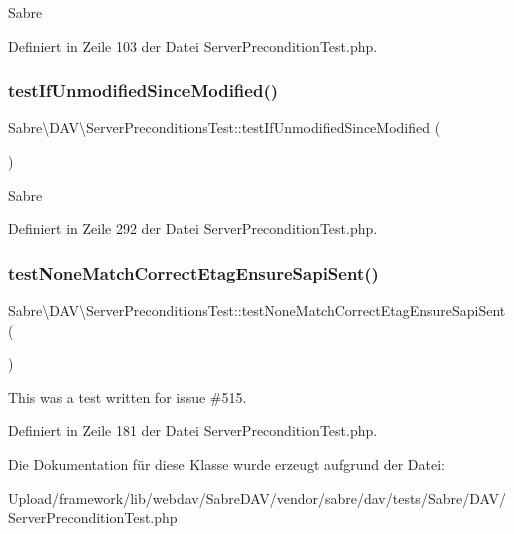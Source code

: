 Sabre 

Definiert in Zeile 103 der Datei Server\+Precondition\+Test.\+php.

\mbox{\label{class_sabre_1_1_d_a_v_1_1_server_preconditions_test_acf099f3a4f922119452b6012a642ec71}} 
\subsubsection{\texorpdfstring{test\+If\+Unmodified\+Since\+Modified()}{testIfUnmodifiedSinceModified()}}
{\footnotesize\ttfamily Sabre\textbackslash{}\+D\+A\+V\textbackslash{}\+Server\+Preconditions\+Test\+::test\+If\+Unmodified\+Since\+Modified (\begin{DoxyParamCaption}{ }\end{DoxyParamCaption})}

Sabre 

Definiert in Zeile 292 der Datei Server\+Precondition\+Test.\+php.

\mbox{\label{class_sabre_1_1_d_a_v_1_1_server_preconditions_test_a2e923dabb07a228337215eebd2a91e34}} 
\subsubsection{\texorpdfstring{test\+None\+Match\+Correct\+Etag\+Ensure\+Sapi\+Sent()}{testNoneMatchCorrectEtagEnsureSapiSent()}}
{\footnotesize\ttfamily Sabre\textbackslash{}\+D\+A\+V\textbackslash{}\+Server\+Preconditions\+Test\+::test\+None\+Match\+Correct\+Etag\+Ensure\+Sapi\+Sent (\begin{DoxyParamCaption}{ }\end{DoxyParamCaption})}

This was a test written for issue \#515. 

Definiert in Zeile 181 der Datei Server\+Precondition\+Test.\+php.



Die Dokumentation für diese Klasse wurde erzeugt aufgrund der Datei\+:\begin{DoxyCompactItemize}
\item 
Upload/framework/lib/webdav/\+Sabre\+D\+A\+V/vendor/sabre/dav/tests/\+Sabre/\+D\+A\+V/Server\+Precondition\+Test.\+php\end{DoxyCompactItemize}

